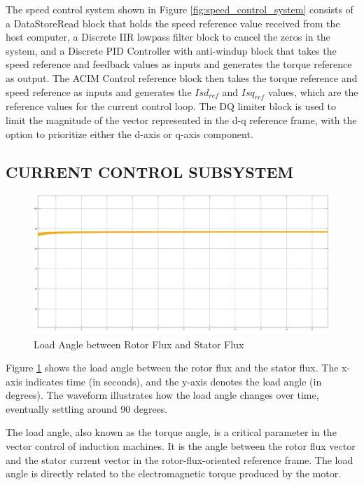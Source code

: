 The speed control system shown in Figure \ref{fig:speed_control_system} consists of a DataStoreRead block that holds the speed reference value received from the host computer, a Discrete IIR lowpass filter block to cancel the zeros in the system, and a Discrete PID Controller with anti-windup block that takes the speed reference and feedback values as inputs and generates the torque reference as output. The ACIM Control reference block then takes the torque reference and speed reference as inputs and generates the $Isd_{ref}$ and $Isq_{ref}$ values, which are the reference values for the current control loop. The DQ limiter block is used to limit the magnitude of the vector represented in the d-q reference frame, with the option to prioritize either the d-axis or q-axis component.


\subsection{CURRENT CONTROL SUBSYSTEM}


\begin{figure}[H]
	\centering
	\includegraphics[width=6in]{sections/section3/images/simulationResutls/LoadAngle.png}
	\caption{Load Angle between Rotor Flux and Stator Flux}
	\label{fig:load_angle_1}
\end{figure}

Figure \ref{fig:load_angle_1} shows the load angle between the rotor flux and the stator flux. The x-axis indicates time (in seconds), and the y-axis denotes the load angle (in degrees). The waveform illustrates how the load angle changes over time, eventually settling around 90 degrees.

The load angle, also known as the torque angle, is a critical parameter in the vector control of induction machines. It is the angle between the rotor flux vector and the stator current vector in the rotor-flux-oriented reference frame. The load angle is directly related to the electromagnetic torque produced by the motor. 

